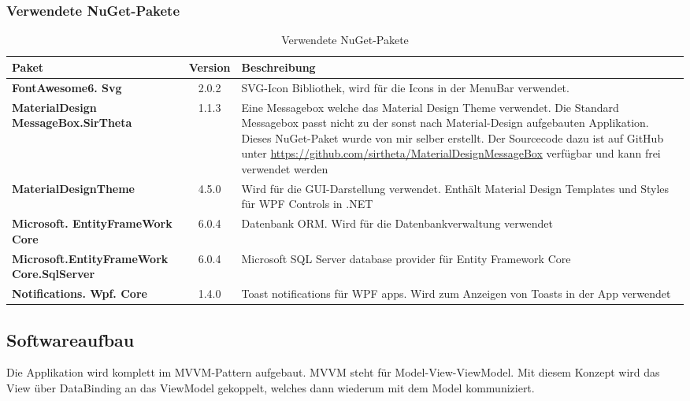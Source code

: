 \subsubsection{Verwendete NuGet-Pakete}
\begin{table}[H]
  \centering
  \settowidth{}
  \setlength\extrarowheight{2pt}
    \begin{tabulary}{1.0\textwidth}{|m{5cm}|C|L|}
      \hline
      \textbf{Paket} & \textbf{Version} & \textbf{Beschreibung}\\
    \hline
    \textbf{FontAwesome6. Svg} & 2.0.2 & SVG-Icon Bibliothek, wird für die Icons in der MenuBar verwendet.\\
    \hline
    \textbf{MaterialDesign MessageBox.SirTheta} & 1.1.3 & Eine Messagebox welche das Material Design Theme verwendet. Die Standard Messagebox passt nicht zu der sonst nach Material-Design aufgebauten Applikation. Dieses NuGet-Paket wurde von mir selber erstellt. Der Sourcecode dazu ist auf GitHub unter \href{https://github.com/sirtheta/MaterialDesignMessageBox}{https://github.com/sirtheta/MaterialDesignMessageBox} verfügbar und kann frei verwendet werden\\
    \hline
    \textbf{MaterialDesignTheme} & 4.5.0 & Wird für die GUI-Darstellung verwendet. Enthält Material Design Templates und Styles für WPF Controls in .NET\\
    \hline
    \textbf{Microsoft. EntityFrameWork Core} & 6.0.4 & Datenbank ORM. Wird für die Datenbankverwaltung verwendet\\
    \hline
    \textbf{Microsoft.EntityFrameWork Core.SqlServer} & 6.0.4 & Microsoft SQL Server database provider für Entity Framework Core\\
    \hline
    \textbf{Notifications. Wpf. Core} & 1.4.0 & Toast notifications für WPF apps. Wird zum Anzeigen von Toasts in der App verwendet \\
    \hline
\end{tabulary}
\caption{Verwendete NuGet-Pakete}
\end{table}

\newpage
\subsection{Softwareaufbau}
Die Applikation wird komplett im MVVM-Pattern aufgebaut. MVVM steht für Model-View-ViewModel. Mit diesem Konzept wird das View über DataBinding an das ViewModel gekoppelt, welches dann wiederum mit dem Model kommuniziert. 

